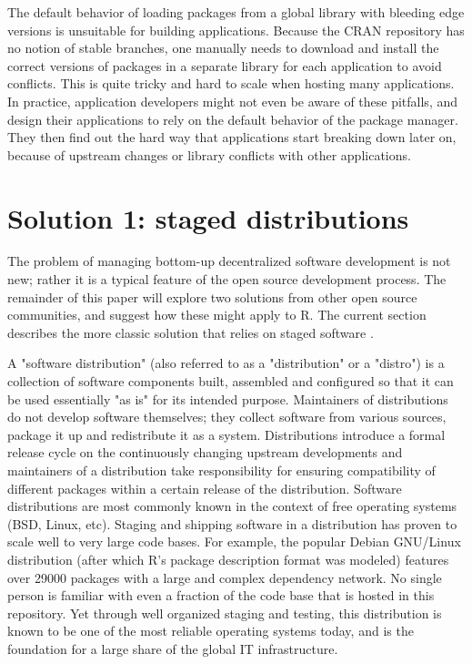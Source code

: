 The default behavior of loading packages from a global library with bleeding
edge versions is unsuitable for building applications. Because the CRAN
repository has no notion of stable branches, one manually needs to download and
install the correct versions of packages in a separate library for each
application to avoid conflicts. This is quite tricky and hard to scale when
hosting many applications. In practice, application developers might not even be
aware of these pitfalls, and design their applications to rely on the default
behavior of the package manager. They then find out the hard way that
applications start breaking down later on, because of upstream changes or
library conflicts with other applications.

\section{Solution 1: staged distributions}

The problem of managing bottom-up decentralized software development is not
new; rather it is a typical feature of the open source development
process. The remainder of this paper will explore two solutions from other open
source communities, and suggest how these might apply to R. The current section
describes the more classic solution that relies on staged software
.

A "software distribution" (also referred to as a "distribution" or a "distro")
is a collection of software components built, assembled and configured so that
it can be used essentially "as is" for its intended purpose. Maintainers of
distributions do not develop software themselves; they collect software from
various sources, package it up and redistribute it as a system. Distributions
introduce a formal release cycle on the continuously changing upstream
developments and maintainers of a distribution take responsibility for ensuring
compatibility of different packages within a certain release of the
distribution. Software distributions are most commonly known in the context of
free operating systems (BSD, Linux, etc). Staging and shipping software in a
distribution has proven to scale well to very large code bases. For example,
the popular Debian GNU/Linux distribution (after which R's package description
format was modeled) features over 29000 packages with a large and complex
dependency network. No single person is familiar with even a fraction of the
code base that is hosted in this repository. Yet through well organized staging and
testing, this distribution is known to be one of the most reliable operating
systems today, and is the foundation for a large share of the global IT
infrastructure.

